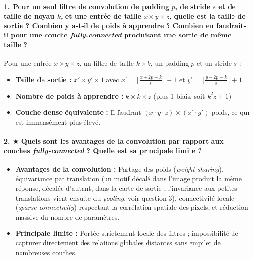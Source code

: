 \documentclass{report}
\begin{document}
\paragraph{1. Pour un seul filtre de convolution de padding $p$, de stride $s$ et de taille de noyau $k$, et une entrée de taille $x \times y \times z$, quelle est la taille de sortie ? Combien y a-t-il de poids à apprendre ? Combien en faudrait-il pour une couche \textit{fully-connected} produisant une sortie de même taille ?}
 Pour une entrée $x \times y \times z$, un filtre de taille $k \times k$, un padding $p$ et un stride $s$ :
\begin{itemize}
    \item \textbf{Taille de sortie :} $x' \times y' \times 1$ avec $x' = \lfloor \frac{x + 2p - k}{s} \rfloor + 1$ et $y' = \lfloor \frac{y + 2p - k}{s} \rfloor + 1$.
    \item \textbf{Nombre de poids à apprendre :} $k \times k \times z$ (plus 1 biais, soit $k^2 z + 1$).
    \item \textbf{Couche dense équivalente :} Il faudrait $(x \cdot y \cdot z) \times (x' \cdot y')$ poids, ce qui est immensément plus élevé.
\end{itemize}

\paragraph{2. $\bigstar$ Quels sont les avantages de la convolution par rapport aux couches \textit{fully-connected} ? Quelle est sa principale limite ?}

\begin{itemize}
    \item \textbf{Avantages de la convolution :} Partage des poids (\textit{weight sharing}), équivariance par translation (un motif décalé dans l'image produit la même réponse, décalée d'autant, dans la carte de sortie ; l'invariance aux petites translations vient ensuite du \textit{pooling}, voir question 3), connectivité locale (\textit{sparse connectivity}) respectant la corrélation spatiale des pixels, et réduction massive du nombre de paramètres.
    \item \textbf{Principale limite :} Portée strictement locale des filtres ; impossibilité de capturer directement des relations globales distantes sans empiler de nombreuses couches.
\end{itemize}
\end{document}
